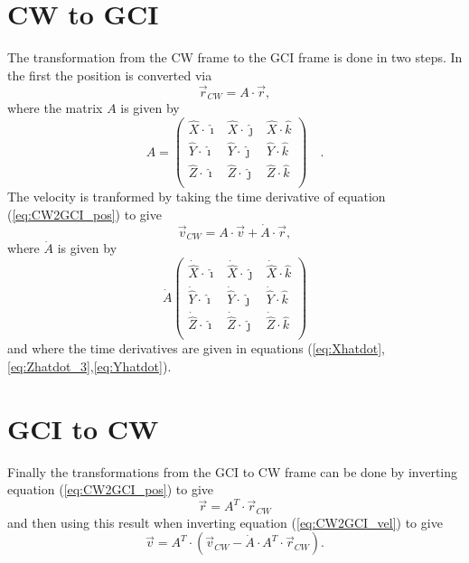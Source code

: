 \documentclass[twocolumn]{article}
\begin{document}
\section{CW to GCI}
The transformation from the CW frame to the GCI frame is done in two steps.  In 
the first the position is converted via
\begin{equation}\label{eq:CW2GCI_pos}
	{\vec r}_{CW} = A \cdot {\vec r},
\end{equation}
where the matrix $A$ is given by
\begin{equation}\label{eq:A}
A = 
\left(
  \begin{array}{clcr}
	 \hat X \cdot \hat \imath  & \hat X \cdot \hat \jmath & \hat X \cdot \hat k  \\
	 \hat Y \cdot \hat \imath  & \hat Y \cdot \hat \jmath & \hat Y \cdot \hat k  \\
	 \hat Z \cdot \hat \imath  & \hat Z \cdot \hat \jmath & \hat Z \cdot \hat k  \\
  \end{array}
\right) \quad .
\end{equation}
The velocity is tranformed by taking the time derivative of equation 
(\ref{eq:CW2GCI_pos})
to give
\begin{equation}\label{eq:CW2GCI_vel}
	{\vec v}_{CW} = A \cdot {\vec v} + {\dot A} \cdot {\vec r},
\end{equation}
where $\dot A$ is given by
\begin{equation}\label{eq:Adot}
{\dot A}
\left(
  \begin{array}{clcr}
	 \dot {\hat X} \cdot \hat \imath  & \dot {\hat X} \cdot \hat \jmath & \dot {\hat X} \cdot \hat k  \\
	 \dot {\hat Y} \cdot \hat \imath  & \dot {\hat Y} \cdot \hat \jmath & \dot {\hat Y} \cdot \hat k  \\
	 \dot {\hat Z} \cdot \hat \imath  & \dot {\hat Z} \cdot \hat \jmath & \dot {\hat Z} \cdot \hat k  \\
  \end{array}
\right)
\end{equation}
and where the time derivatives are given in equations (\ref{eq:Xhatdot}, 
\ref{eq:Zhatdot_3},\ref{eq:Yhatdot}).


\section{GCI to CW}

Finally the transformations from the GCI to CW frame can be done by inverting 
equation (\ref{eq:CW2GCI_pos}) to give
\begin{equation}
	\vec r = A^{T} \cdot {\vec r}_{CW}
\end{equation}
and then using this result when inverting equation (\ref{eq:CW2GCI_vel}) to give
\begin{equation}
	\vec v = A^{T} \cdot \left( {\vec v}_{CW} - {\dot A} \cdot A^{T} 
	               \cdot {\vec r}_{CW} \right).
\end{equation}





                  
\end{document}
